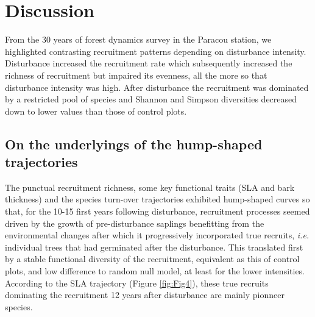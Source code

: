 \documentclass[fleqn,10pt]{ArtEcoFoG} %
\begin{document}
\section{Discussion}\label{discussion}

From the 30 years of forest dynamics survey in the Paracou station, we
highlighted contrasting recruitment patterns depending on disturbance
intensity. Disturbance increased the recruitment rate which subsequently
increased the richness of recruitment but impaired its evenness, all the
more so that disturbance intensity was high. After disturbance the
recruitment was dominated by a restricted pool of species and Shannon
and Simpson diversities decreased down to lower values than those of
control plots.

\subsection{On the underlyings of the hump-shaped
trajectories}\label{on-the-underlyings-of-the-hump-shaped-trajectories}

The punctual recruitment richness, some key functional traits (SLA and
bark thickness) and the species turn-over trajectories exhibited
hump-shaped curves so that, for the 10-15 first years following
disturbance, recruitment processes seemed driven by the growth of
pre-disturbance saplings benefitting from the environmental changes
\citep{Herault2010} after which it progressively incorporated true
recruits, \emph{i.e.} individual trees that had germinated after the
disturbance. This translated first by a stable functional diversity of
the recruitment, equivalent as this of control plots, and low difference
to random null model, at least for the lower intensities. According to
the SLA trajectory (Figure \ref{fig:Fig4}), these true recruits
dominating the recruitment 12 years after disturbance are mainly
pionneer species.
\end{document}
